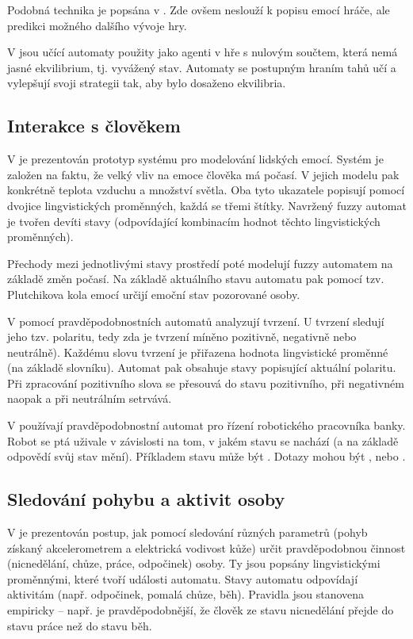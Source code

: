 \documentclass[a4paper,10pt]{article}
\begin{document}
Podobná technika je popsána v \cite{Hua+-LeaProbAutModChe}. Zde ovšem neslouží k popisu emocí hráče, ale predikci možného dalšího vývoje hry.

V \cite{FuLi-ForLeaAutAutGam} jsou učící automaty použity jako agenti v hře s nulovým součtem, která nemá jasné ekvilibrium, tj. vyvážený stav. Automaty se postupným hraním tahů učí a vylepšují svoji strategii tak, aby bylo dosaženo ekvilibria.

\subsection{Interakce s člověkem}
V \cite{HeiTri-SimEmoPerHumComInt} je prezentován prototyp systému pro modelování lidských emocí. Systém je založen na faktu, že velký vliv na emoce člověka má počasí. V jejich modelu pak konkrétně teplota vzduchu a množství světla. Oba tyto ukazatele popisují pomocí dvojice lingvistických proměnných, každá se třemi štítky. Navržený fuzzy automat je tvořen devíti stavy (odpovídající kombinacím hodnot těchto lingvistických proměnných).

Přechody mezi jednotlivými stavy prostředí poté modelují fuzzy automatem na základě změn počasí. Na základě aktuálního stavu automatu pak pomocí tzv. Plutchikova kola emocí určijí emoční stav pozorované osoby.


V \cite{Cas+-ProAutAspBasSenAna} pomocí pravděpodobnostních automatů analyzují tvrzení. U tvrzení sledují jeho tzv. polaritu, tedy zda je tvrzení míněno pozitivně, negativně nebo neutrálně). Každému slovu tvrzení je přiřazena hodnota lingvistické proměnné  (na základě slovníku). Automat pak obsahuje stavy popisující aktuální polaritu. Při zpracování pozitivního slova se přesouvá do stavu  pozitivního, při negativném naopak a při neutrálním setrvává.

V \cite{SchYou-ProSimHumMacDia} používají pravděpodobnostní automat pro řízení robotického pracovníka banky. Robot se ptá uživale v závislosti na tom, v jakém stavu se nachází (a na základě odpovědí svůj stav mění). Příkladem stavu může být . Dotazy mohou být ,  nebo .


\subsection{Sledování pohybu a aktivit osoby}
V \cite{TriHei-LinSumHumActSkiConAcc} je prezentován postup, jak pomocí sledování různých parametrů (pohyb získaný akcelerometrem a elektrická vodivost kůže) určit pravděpodobnou činnost (nicnedělání, chůze, práce, odpočinek) osoby. Ty jsou popsány lingvistickými proměnnými, které tvoří události automatu. Stavy automatu odpovídají aktivitám (např. odpočinek, pomalá chůze, běh). Pravidla jsou stanovena empiricky -- např. je pravděpodobnější, že člověk ze stavu nicnedělání přejde do stavu práce než do stavu běh.
\end{document}
